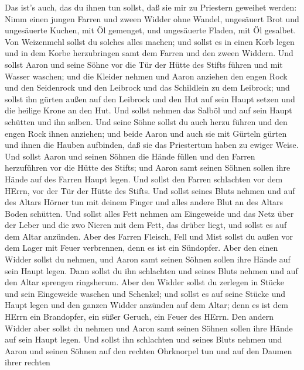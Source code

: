  Das ist's auch, das du ihnen tun sollst, daß sie mir zu
Priestern geweihet werden: Nimm einen jungen Farren und zween Widder
ohne Wandel,  ungesäuert Brot und ungesäuerte Kuchen, mit Öl
gemenget, und ungesäuerte Fladen, mit Öl gesalbet. Von Weizenmehl sollst
du solches alles machen;  und sollst es in einen Korb legen
und in dem Korbe herzubringen samt dem Farren und den zween Widdern.
 Und sollst Aaron und seine Söhne vor die Tür der Hütte des
Stifts führen und mit Wasser waschen;  und die Kleider
nehmen und Aaron anziehen den engen Rock und den Seidenrock und den
Leibrock und das Schildlein zu dem Leibrock; und sollst ihn gürten außen
auf den Leibrock  und den Hut auf sein Haupt setzen und die
heilige Krone an den Hut.  Und sollst nehmen das Salböl und
auf sein Haupt schütten und ihn salben.  Und seine Söhne
sollst du auch herzu führen und den engen Rock ihnen anziehen;
 und beide Aaron und auch sie mit Gürteln gürten und ihnen
die Hauben aufbinden, daß sie das Priestertum haben zu ewiger Weise. Und
sollst Aaron und seinen Söhnen die Hände füllen  und den
Farren herzuführen vor die Hütte des Stifts; und Aaron samt seinen
Söhnen sollen ihre Hände auf des Farren Haupt legen.  Und
sollst den Farren schlachten vor dem HErrn, vor der Tür der Hütte des
Stifts.  Und sollst seines Bluts nehmen und auf des Altars
Hörner tun mit deinem Finger und alles andere Blut an des Altars Boden
schütten.  Und sollst alles Fett nehmen am Eingeweide und
das Netz über der Leber und die zwo Nieren mit dem Fett, das drüber
liegt, und sollst es auf dem Altar anzünden.  Aber des
Farren Fleisch, Fell und Mist sollst du außen vor dem Lager mit Feuer
verbrennen, denn es ist ein Sündopfer.  Aber den einen
Widder sollst du nehmen, und Aaron samt seinen Söhnen sollen ihre Hände
auf sein Haupt legen.  Dann sollst du ihn schlachten und
seines Bluts nehmen und auf den Altar sprengen ringsherum. 
Aber den Widder sollst du zerlegen in Stücke und sein Eingeweide waschen
und Schenkel; und sollst es auf seine Stücke und Haupt legen
 und den ganzen Widder anzünden auf dem Altar; denn es ist
dem HErrn ein Brandopfer, ein süßer Geruch, ein Feuer des HErrn.
 Den andern Widder aber sollst du nehmen und Aaron samt
seinen Söhnen sollen ihre Hände auf sein Haupt legen.  Und
sollst ihn schlachten und seines Bluts nehmen und Aaron und seinen
Söhnen auf den rechten Ohrknorpel tun und auf den Daumen ihrer rechten
